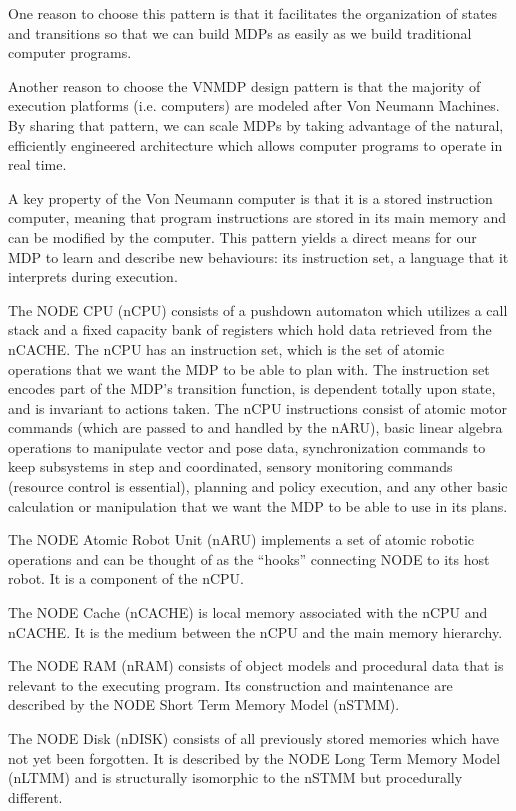 \documentclass[conference]{IEEEtran}
\begin{document}
One reason to choose this pattern is that it facilitates the organization of states
and transitions so that we can build MDPs as easily as we build traditional computer programs.

Another reason to choose the VNMDP design pattern is that the majority of execution platforms
(i.e. computers) are modeled after Von Neumann Machines. By sharing that pattern,
we can scale MDPs by taking advantage of the natural, efficiently engineered architecture
which allows computer programs to operate in real time.

A key property of the Von Neumann computer is that it is a stored instruction computer,
meaning that program instructions are stored in its main memory and can be modified
by the computer.  This pattern yields a direct means for our MDP to learn and describe new
behaviours: its instruction set, a language that it interprets during execution.

The NODE CPU (nCPU) consists of a pushdown automaton which utilizes a call stack and a fixed capacity
bank of registers which hold data retrieved from the nCACHE.
The nCPU has an instruction set, which is the set of atomic operations that we want the MDP to be able
to plan with. The instruction set encodes part of the MDP's transition function, is dependent 
totally upon state, and is invariant to actions taken.
The nCPU instructions consist of atomic motor commands (which are passed to and handled by the nARU),
basic linear algebra operations to manipulate vector and pose data, synchronization commands to keep
subsystems in step and coordinated, sensory monitoring commands (resource control is essential), 
planning and policy execution, and any other basic calculation or manipulation that we want the 
MDP to be able to use in its plans.

The NODE Atomic Robot Unit (nARU) implements a set of atomic robotic operations and can be 
thought of as the “hooks” connecting NODE to its host robot. It is a component of the nCPU.

The NODE Cache (nCACHE) is local memory associated with the nCPU and nCACHE. It is the medium
between the nCPU and the main memory hierarchy.

The NODE RAM (nRAM) consists of object models and procedural data that is relevant to the 
executing program. Its construction and maintenance are described by the NODE Short Term Memory 
Model (nSTMM).

The NODE Disk (nDISK) consists of all previously stored memories which have not yet been 
forgotten. It is described by the NODE Long Term Memory Model (nLTMM) and is structurally 
isomorphic to the nSTMM but procedurally different.
\end{document}

